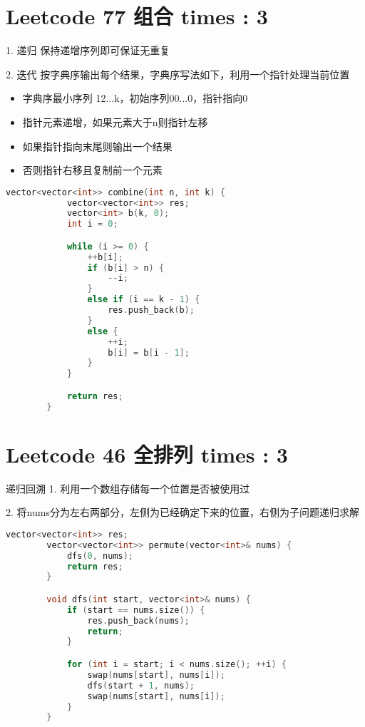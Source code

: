 \documentclass[UTF8]{ctexart}
\begin{document}
\section{Leetcode 77 组合 times : 3}
1. 递归 保持递增序列即可保证无重复

2. 迭代 按字典序输出每个结果，字典序写法如下，利用一个指针处理当前位置
\begin{itemize}
	\item 字典序最小序列 12...k，初始序列00...0，指针指向0
	\item 指针元素递增，如果元素大于n则指针左移
	\item 如果指针指向末尾则输出一个结果
	\item 否则指针右移且复制前一个元素
\end{itemize}

\begin{framed}
	\begin{lstlisting}[language=C++]
		vector<vector<int>> combine(int n, int k) {
			vector<vector<int>> res;
			vector<int> b(k, 0);
			int i = 0;

			while (i >= 0) {
				++b[i];
				if (b[i] > n) {
					--i;
				}
				else if (i == k - 1) {
					res.push_back(b);
				}
				else {
					++i;
					b[i] = b[i - 1];
				}
			}

			return res;
		}
	\end{lstlisting}
\end{framed}

\section{Leetcode 46 全排列 times : 3}
递归回溯
1. 利用一个数组存储每一个位置是否被使用过

2. 将nums分为左右两部分，左侧为已经确定下来的位置，右侧为子问题递归求解
\begin{framed}
	\begin{lstlisting}[language=C++]
		vector<vector<int>> res;
		vector<vector<int>> permute(vector<int>& nums) {
			dfs(0, nums);
			return res;
		}

		void dfs(int start, vector<int>& nums) {
			if (start == nums.size()) {
				res.push_back(nums);
				return;
			}

			for (int i = start; i < nums.size(); ++i) {
				swap(nums[start], nums[i]);
				dfs(start + 1, nums);
				swap(nums[start], nums[i]);
			}
		}
	\end{lstlisting}
\end{framed}
\end{document}
